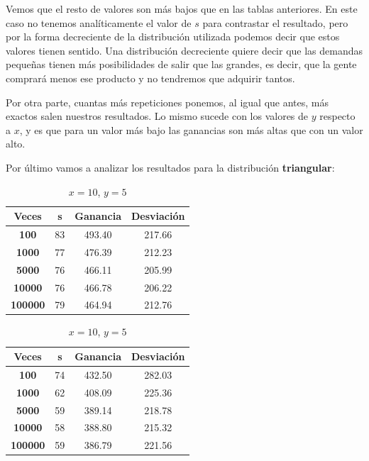 \documentclass[11pt,a4paper]{report}
\begin{document}
Vemos que el resto de valores son más bajos que en las tablas anteriores. En este caso no tenemos analíticamente el valor de $s$ para contrastar el
resultado, pero por la forma decreciente de la distribución utilizada podemos decir que estos valores tienen sentido. Una distribución decreciente
quiere decir que las demandas pequeñas tienen más posibilidades de salir que las grandes, es decir, que la gente comprará menos ese producto y no 
tendremos que adquirir tantos.

Por otra parte, cuantas más repeticiones ponemos, al igual que antes, más exactos salen nuestros resultados. Lo mismo sucede con los valores de $y$
respecto a $x$, y es que para un valor más bajo las ganancias son más altas que con un valor alto.

Por último vamos a analizar los resultados para la distribución \textbf{triangular}:
\begin{table}[H]
	\parbox{.45\linewidth}{
	\centering
	\begin{tabular}{c|ccc}
	\textbf{Veces} & \textbf{s} & \textbf{Ganancia} & \textbf{Desviación} \\ \hline
	\textbf{100}   & 83         & 493.40            & 217.66			  \\ \hline
	\textbf{1000}  & 77         & 476.39            & 212.23			  \\ \hline
	\textbf{5000}  & 76         & 466.11            & 205.99 			  \\ \hline
	\textbf{10000} & 76         & 466.78            & 206.22			  \\ \hline
	\textbf{100000}& 79         & 464.94            & 212.76			  \\
	\end{tabular}
	\caption{$x=10$, $y=1$}
	}
	\hfill
	\parbox{.45\linewidth}{
	\centering
	\begin{tabular}{c|ccc}
	\textbf{Veces} & \textbf{s} & \textbf{Ganancia} & \textbf{Desviación} \\ \hline
	\textbf{100}   & 74         & 432.50            & 282.03			  \\ \hline
	\textbf{1000}  & 62         & 408.09            & 225.36			  \\ \hline
	\textbf{5000}  & 59         & 389.14            & 218.78 			  \\ \hline
	\textbf{10000} & 58         & 388.80            & 215.32			  \\ \hline
	\textbf{100000}& 59         & 386.79            & 221.56 			  \\
	\end{tabular}
	\caption{$x=10$, $y=5$}
	}
\end{table}
\end{document}
